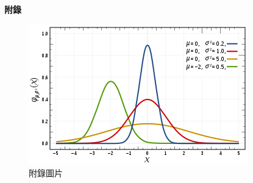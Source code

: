 \clearpage
\begin{center}
  {\bfseries\chinnesesize 附錄}
\end{center}
\renewcommand{\thechapter}{附錄}
\renewcommand{\thefigure}{\Roman{figure}}
\renewcommand{\theequation}{\Roman{equation}}
\renewcommand{\thetable}{\Roman{table}}

\setcounter{equation}{0}
\setcounter{figure}{0}
\setcounter{footnote}{0}
\setcounter{section}{0}
\setcounter{subsection}{0}
\setcounter{subsubsection}{0}
\setcounter{table}{0}



\begin{figure}[h]
  \centerline{\includegraphics[width=0.5\columnwidth]{Images/gambar.png}}
  \caption*{附錄圖片}
  \label{fig:figure_2}
\end{figure}
